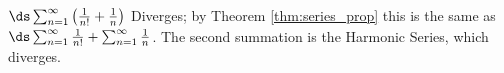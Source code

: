 {$\ds \sum_{n=1}^\infty \left(\frac{1}{n!}+\frac1n\right)$
}
{Diverges; by Theorem \ref{thm:series_prop} this is the same as $\ds \sum_{n=1}^\infty \frac{1}{n!}+ \sum_{n=1}^\infty\frac1n$. The second summation is the Harmonic Series, which diverges.
}